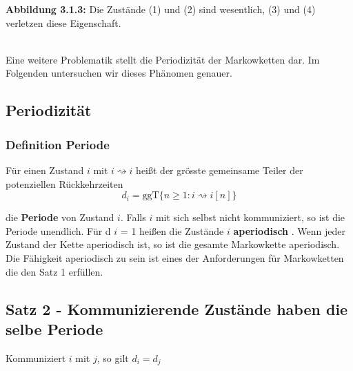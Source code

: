 \documentclass[a4paper]{article}
\begin{document}
\begin{center}
\end{center}
\qquad \caption{\textbf{Abbildung 3.1.3:}  Die Zustände (1) und (2) sind wesentlich, (3) und (4) verletzen diese Eigenschaft.
}
\\

Eine weitere Problematik stellt die Periodizität der Markowketten dar. Im Folgenden untersuchen wir
dieses Phänomen genauer.

\subsection{Periodizität}

\subsubsection{Definition Periode}
Für einen Zustand $i$ mit $i \rightsquigarrow i$ heißt der grösste gemeinsame
Teiler der potenziellen Rückkehrzeiten
\[
d_i = \text{ggT} \{
	n \geq 1 : i \rightsquigarrow i [n]
\} 
\] 

die \textbf{Periode} von Zustand $i$. Falls $i$ mit sich selbst nicht kommuniziert, so ist die Periode unendlich.
Für d $i$ = 1 heißen die Zustände $i$ \textbf{aperiodisch} . Wenn jeder Zustand der Kette aperiodisch ist, so ist die
gesamte Markowkette aperiodisch. Die Fähigkeit aperiodisch zu sein ist eines der Anforderungen
für Markowketten die den Satz 1 erfüllen.

\subsection{Satz 2 - Kommunizierende Zustände haben die selbe Periode}
Kommuniziert $i$ mit $j$, so gilt $d_i = d_j$
\end{document}
